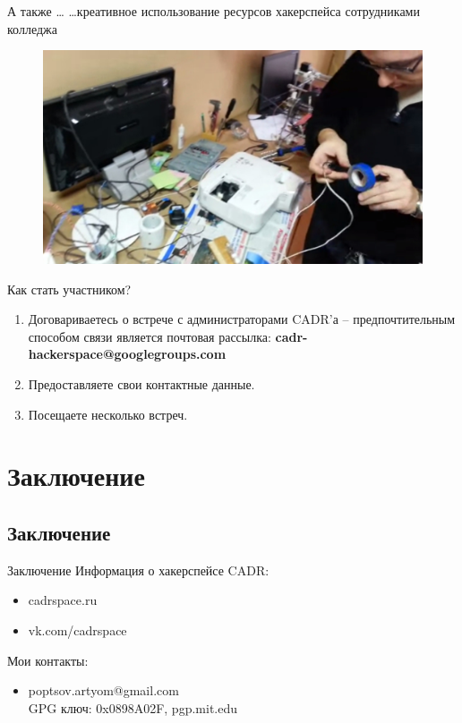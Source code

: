 \documentclass[presentation]{beamer}
\begin{document}
\begin{frame}[label=sec-2-2-4]{А также \ldots}
  \ldots креативное использование ресурсов хакерспейса сотрудниками
  колледжа
  \begin{figure}
    \includegraphics[width=.9\linewidth]{cadr-projector-test}
  \end{figure}
\end{frame}

\begin{frame}[label=sec-2-2-5]{Как стать участником?}
  \begin{enumerate}
  \item Договариваетесь о встрече с администраторами CADR'а --
    предпочтительным способом связи является почтовая рассылка:
    \textbf{cadr-hackerspace@googlegroups.com}
  \item Предоставляете свои контактные данные.
  \item Посещаете несколько встреч.
  \end{enumerate}
\end{frame}

\section{Заключение}
\label{sec-3}
\subsection{Заключение}
\label{sec-3-1}

\begin{frame}[label=sec-3-1-1]{Заключение}
  Информация о хакерспейсе CADR:
  \begin{itemize}
  \item cadrspace.ru
  \item vk.com/cadrspace
  \end{itemize}

  Мои контакты:
  \begin{itemize}
  \item poptsov.artyom@gmail.com \\
    GPG ключ: 0x0898A02F, pgp.mit.edu
  \end{itemize}
\end{frame}
\end{document}
